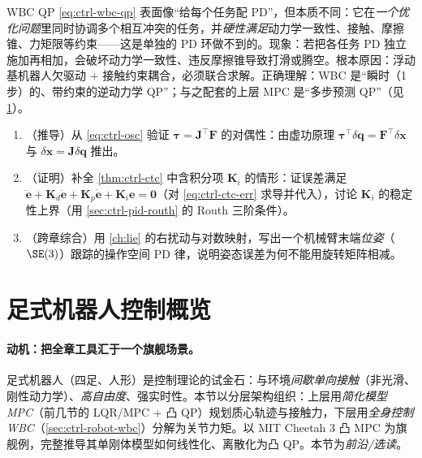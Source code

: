 \begin{pitfall}
WBC QP \cref{eq:ctrl-wbc-qp} 表面像“给每个任务配 PD”，但本质不同：它在\emph{一个优化问题}里同时协调多个相互冲突的任务，并\emph{硬性满足}动力学一致性、接触、摩擦锥、力矩限等约束——这是单独的 PD 环做不到的。现象：若把各任务 PD 独立施加再相加，会破坏动力学一致性、违反摩擦锥导致打滑或腾空。根本原因：浮动基机器人欠驱动 + 接触约束耦合，必须联合求解。正确理解：WBC 是“瞬时（1 步）的、带约束的逆动力学 QP”；与之配套的上层 MPC 是“多步预测 QP”（见 \cref{sec:ctrl-legged}）。
\end{pitfall}

\begin{practice}
\begin{enumerate}
  \item （推导）从 \cref{eq:ctrl-osc} 验证 $\boldsymbol{\tau}=\mathbf{J}^\top\mathbf{F}$ 的对偶性：由虚功原理 $\boldsymbol{\tau}^\top\delta\mathbf{q}=\mathbf{F}^\top\delta\mathbf{x}$ 与 $\delta\mathbf{x}=\mathbf{J}\delta\mathbf{q}$ 推出。
  \item （证明）补全 \cref{thm:ctrl-ctc} 中含积分项 $\mathbf{K}_i$ 的情形：证误差满足 $\dddot{\mathbf{e}}+\mathbf{K}_d\ddot{\mathbf{e}}+\mathbf{K}_p\dot{\mathbf{e}}+\mathbf{K}_i\mathbf{e}=\mathbf{0}$（对 \cref{eq:ctrl-ctc-err} 求导并代入），讨论 $\mathbf{K}_i$ 的稳定性上界（用 \cref{sec:ctrl-pid-routh} 的 Routh 三阶条件）。
  \item （跨章综合）用 \cref{ch:lie} 的右扰动与对数映射，写出一个机械臂末端\emph{位姿}（$\SE(3)$）跟踪的操作空间 PD 律，说明姿态误差为何不能用旋转矩阵相减。
\end{enumerate}
\end{practice}

\section{足式机器人控制概览}
\label{sec:ctrl-legged}

\paragraph{动机：把全章工具汇于一个旗舰场景。}
足式机器人（四足、人形）是控制理论的试金石：与环境\emph{间歇单向接触}（非光滑、刚性动力学）、\emph{高自由度}、强实时性。本节以分层架构组织：上层用\emph{简化模型 MPC}（前几节的 LQR/MPC + 凸 QP）规划质心轨迹与接触力，下层用\emph{全身控制 WBC}（\cref{sec:ctrl-robot-wbc}）分解为关节力矩。以 MIT Cheetah 3 凸 MPC 为旗舰例，完整推导其单刚体模型如何线性化、离散化为凸 QP。本节为\emph{前沿/选读}。

